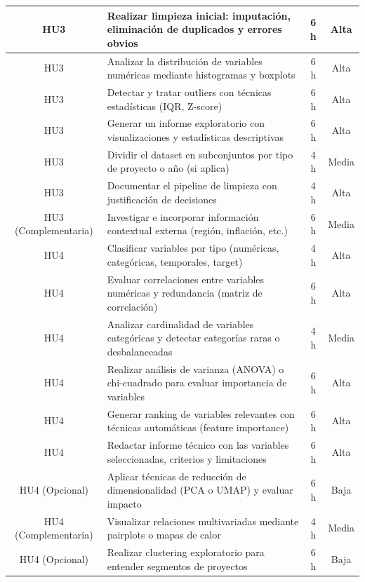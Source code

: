 \documentclass[
11pt, %
]{charter}
\begin{document}
\begin{table}[htpb]
\centering
\begin{tabularx}{\linewidth}{@{}|c|X|c|c|@{}}
\hline
\rowcolor[HTML]{C0C0C0}

HU3 & Realizar limpieza inicial: imputación, eliminación de duplicados y errores obvios & 6 h & Alta \\ \hline
HU3 & Analizar la distribución de variables numéricas mediante histogramas y boxplots & 6 h & Alta \\ \hline
HU3 & Detectar y tratar outliers con técnicas estadísticas (IQR, Z-score) & 6 h & Alta \\ \hline
HU3 & Generar un informe exploratorio con visualizaciones y estadísticas descriptivas & 6 h & Alta \\ \hline
HU3 & Dividir el dataset en subconjuntos por tipo de proyecto o año (si aplica) & 4 h & Media \\ \hline
HU3 & Documentar el pipeline de limpieza con justificación de decisiones & 4 h & Alta \\ \hline
HU3 (Complementaria) & Investigar e incorporar información contextual externa (región, inflación, etc.) & 6 h & Media \\ \hline

HU4 & Clasificar variables por tipo (numéricas, categóricas, temporales, target) & 4 h & Alta \\ \hline
HU4 & Evaluar correlaciones entre variables numéricas y redundancia (matriz de correlación) & 6 h & Alta \\ \hline
HU4 & Analizar cardinalidad de variables categóricas y detectar categorías raras o desbalanceadas & 4 h & Media \\ \hline
HU4 & Realizar análisis de varianza (ANOVA) o chi-cuadrado para evaluar importancia de variables & 6 h & Alta \\ \hline
HU4 & Generar ranking de variables relevantes con técnicas automáticas (feature importance) & 6 h & Alta \\ \hline
HU4 & Redactar informe técnico con las variables seleccionadas, criterios y limitaciones & 6 h & Alta \\ \hline
HU4 (Opcional) & Aplicar técnicas de reducción de dimensionalidad (PCA o UMAP) y evaluar impacto & 6 h & Baja \\ \hline
HU4 (Complementaria) & Visualizar relaciones multivariadas mediante pairplots o mapas de calor & 4 h & Media \\ \hline
HU4 (Opcional) & Realizar clustering exploratorio para entender segmentos de proyectos & 6 h & Baja \\ \hline


\end{tabularx}
\end{table}
\end{document}

